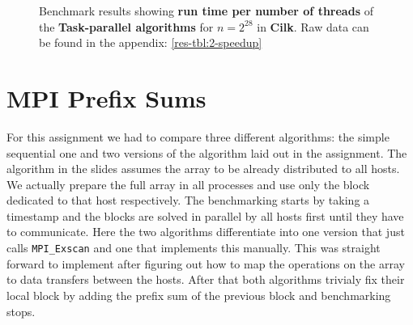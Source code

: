 \begin{figure}[h!]
\centering
{}
\caption{Benchmark results showing \textbf{run time per number of threads} of the \textbf{Task-parallel algorithms} for $n=2^{28}$ in \textbf{Cilk}. Raw data can be found in the appendix: \autoref{res-tbl:2-speedup}}
\label{plot:2-speedup}
\end{figure}


\section{MPI Prefix Sums}

For this assignment we had to compare three different algorithms: the simple sequential one and two versions of the algorithm laid out in the assignment.
The algorithm in the slides assumes the array to be already distributed to all hosts.
We actually prepare the full array in all processes and use only the block dedicated to that host respectively.
The benchmarking starts by taking a timestamp and the blocks are solved in parallel by all hosts first until they have to communicate.
Here the two algorithms differentiate into one version that just calls \texttt{MPI\_Exscan} and one that implements this manually.
This was straight forward to implement after figuring out how to map the operations on the array to data transfers between the hosts.
After that both algorithms trivialy fix their local block by adding the prefix sum of the previous block and benchmarking stops.

